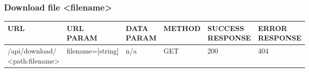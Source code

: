 \subsubsection{Download file <filename>}
\begin{table}[h]
    \begin{tabular}[h]{llllll}
    URL          & \specialcell{URL\\PARAM}     & \specialcell{DATA\\PARAM}  & METHOD &  \specialcell{SUCCESS\\RESPONSE} & \specialcell{ERROR\\RESPONSE} \\ \hline
    \specialcell{/api/download/\\<path:filename>} &  filename=[string] & n/a        & GET    & 200              & 404            \\ 
    \end{tabular}
\end{table}
